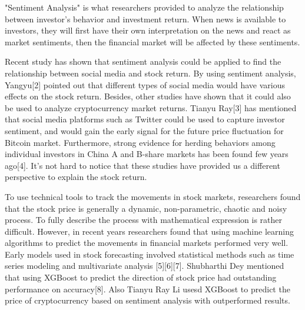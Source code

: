 \documentclass[letterpaper]{article}
\begin{document}

"Sentiment Analysis" is what researchers provided to analyze the relationship between investor's behavior and investment return. When news is available to investors, they will first have their own interpretation on the news and react as market sentiments, then the financial market will be affected by these sentiments.

Recent study has shown that sentiment analysis could be applied to find the relationship between social media and stock return. By using sentiment analysis, Yangyu[2] pointed out that different types of social media would have various effects on the stock return. Besides, other studies have shown that it could also be used to analyze cryptocurrency market returns. Tianyu Ray[3] has mentioned that social media platforms such as Twitter could be used to capture investor sentiment, and would gain the early signal for the future price fluctuation for Bitcoin market. Furthermore, strong evidence for herding behaviors among individual investors in China A and B-share markets has been found few years ago[4]. It's not hard to notice that these studies have provided us a different perspective to explain the stock return. 

To use technical tools to track the movements in stock markets, researchers found that the stock price is generally a dynamic, non-parametric, chaotic and noisy process. To fully describe the process with mathematical expression is rather difficult. However, in recent years researchers found that using machine learning algorithms to predict the movements in financial markets performed very well. Early models used in stock forecasting involved statistical methods such as time series modeling and multivariate analysis [5][6][7]. Shubharthi Dey mentioned that using XGBoost to predict the direction of stock price had outstanding performance on accuracy[8]. Also Tianyu Ray Li usesd XGBoost to predict the price of cryptocurrency based on sentiment analysis with outperformed results.


\end{document}
